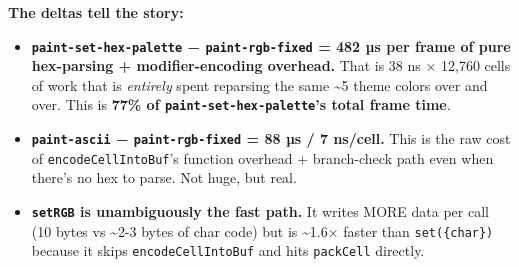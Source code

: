 

\textbf{The deltas tell the story:}

\begin{itemize}
\tightlist
\item
  \textbf{\texttt{p\allowbreak{}a\allowbreak{}i\allowbreak{}n\allowbreak{}t\allowbreak{}-\allowbreak{}s\allowbreak{}e\allowbreak{}t\allowbreak{}-\allowbreak{}h\allowbreak{}e\allowbreak{}x\allowbreak{}-\allowbreak{}p\allowbreak{}a\allowbreak{}l\allowbreak{}e\allowbreak{}t\allowbreak{}t\allowbreak{}e} − \texttt{p\allowbreak{}a\allowbreak{}i\allowbreak{}n\allowbreak{}t\allowbreak{}-\allowbreak{}r\allowbreak{}g\allowbreak{}b\allowbreak{}-\allowbreak{}f\allowbreak{}i\allowbreak{}x\allowbreak{}e\allowbreak{}d} = 482 µs per frame of pure hex-parsing + modifier-encoding overhead.} That is 38 ns × 12,760 cells of work that is \emph{entirely} spent reparsing the same \textasciitilde5 theme colors over and over. This is \textbf{77\% of \texttt{p\allowbreak{}a\allowbreak{}i\allowbreak{}n\allowbreak{}t\allowbreak{}-\allowbreak{}s\allowbreak{}e\allowbreak{}t\allowbreak{}-\allowbreak{}h\allowbreak{}e\allowbreak{}x\allowbreak{}-\allowbreak{}p\allowbreak{}a\allowbreak{}l\allowbreak{}e\allowbreak{}t\allowbreak{}t\allowbreak{}e}'s total frame time}.
\item
  \textbf{\texttt{p\allowbreak{}a\allowbreak{}i\allowbreak{}n\allowbreak{}t\allowbreak{}-\allowbreak{}a\allowbreak{}s\allowbreak{}c\allowbreak{}i\allowbreak{}i} − \texttt{p\allowbreak{}a\allowbreak{}i\allowbreak{}n\allowbreak{}t\allowbreak{}-\allowbreak{}r\allowbreak{}g\allowbreak{}b\allowbreak{}-\allowbreak{}f\allowbreak{}i\allowbreak{}x\allowbreak{}e\allowbreak{}d} = 88 µs / 7 ns/cell.} This is the raw cost of \texttt{e\allowbreak{}n\allowbreak{}c\allowbreak{}o\allowbreak{}d\allowbreak{}e\allowbreak{}C\allowbreak{}e\allowbreak{}l\allowbreak{}l\allowbreak{}I\allowbreak{}n\allowbreak{}t\allowbreak{}o\allowbreak{}B\allowbreak{}u\allowbreak{}f}'s function overhead + branch-check path even when there's no hex to parse. Not huge, but real.
\item
  \textbf{\texttt{s\allowbreak{}e\allowbreak{}t\allowbreak{}R\allowbreak{}G\allowbreak{}B} is unambiguously the fast path.} It writes MORE data per call (10 bytes vs \textasciitilde2-3 bytes of char code) but is \textasciitilde1.6× faster than \texttt{s\allowbreak{}e\allowbreak{}t\allowbreak{}(\allowbreak{}\{\allowbreak{}c\allowbreak{}h\allowbreak{}a\allowbreak{}r\allowbreak{}\}\allowbreak{})} because it skips \texttt{e\allowbreak{}n\allowbreak{}c\allowbreak{}o\allowbreak{}d\allowbreak{}e\allowbreak{}C\allowbreak{}e\allowbreak{}l\allowbreak{}l\allowbreak{}I\allowbreak{}n\allowbreak{}t\allowbreak{}o\allowbreak{}B\allowbreak{}u\allowbreak{}f} and hits \texttt{p\allowbreak{}a\allowbreak{}c\allowbreak{}k\allowbreak{}C\allowbreak{}e\allowbreak{}l\allowbreak{}l} directly.
\end{itemize}

